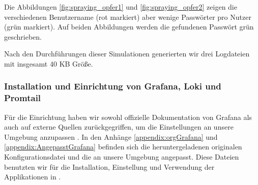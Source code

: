 Die Abbildungen \ref{fig:spraying_opfer1} und \ref{fig:spraying_opfer2} zeigen die verschiedenen Benutzername (rot markiert) aber wenige Passwörter pro Nutzer (grün markiert). Auf beiden Abbildungen werden die gefundenen Passwört grün geschrieben.

Nach den Durchführungen dieser Simulationen generierten wir drei Logdateien mit insgesamt 40 KB Größe.

\newpage
\subsubsection{Installation und Einrichtung von Grafana, Loki und Promtail}
Für die Einrichtung haben wir sowohl offizielle Dokumentation von Grafana als auch auf externe Quellen zurückgegriffen, um die Einstellungen an unsere Umgebung anzupassen \citep{Polinowski_PGL}. In den Anhänge \ref{appendix:orgGrafana} und \ref{appendix:AngepasstGrafana} befinden sich die heruntergeladenen originalen Konfigurationsdatei und die an unsere Umgebung angepasst. Diese Dateien benutzten wir für die Installation, Einstellung und Verwendung der Applikationen in .







